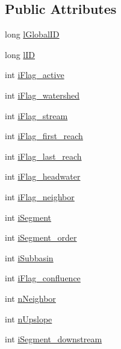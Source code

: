 \subsection*{Public Attributes}
\begin{DoxyCompactItemize}
\item 
long \hyperlink{classhexwatershed_1_1hexagon_accf17b2b8de32d01b9bd0a06ba492a4e}{l\-Global\-I\-D}
\item 
long \hyperlink{classhexwatershed_1_1hexagon_a9f4085d0184401658d991affe014ed0e}{l\-I\-D}
\item 
int \hyperlink{classhexwatershed_1_1hexagon_acbc3b3f0c16e635ce7d8c4c83456325b}{i\-Flag\-\_\-active}
\item 
int \hyperlink{classhexwatershed_1_1hexagon_a28e0a8923873cbd8e196c2b902fa4730}{i\-Flag\-\_\-watershed}
\item 
int \hyperlink{classhexwatershed_1_1hexagon_ad651b1f48c8e7369d3199a6a53c87061}{i\-Flag\-\_\-stream}
\item 
int \hyperlink{classhexwatershed_1_1hexagon_ac1c5a756f508d9880d1b5bbd92517cf4}{i\-Flag\-\_\-first\-\_\-reach}
\item 
int \hyperlink{classhexwatershed_1_1hexagon_a8358691197123bb90b2059ad85179e7a}{i\-Flag\-\_\-last\-\_\-reach}
\item 
int \hyperlink{classhexwatershed_1_1hexagon_a1a939fd274a91144584d445054f3ca0e}{i\-Flag\-\_\-headwater}
\item 
int \hyperlink{classhexwatershed_1_1hexagon_aa8e83f769286538ff90abbfc60f74897}{i\-Flag\-\_\-neighbor}
\item 
int \hyperlink{classhexwatershed_1_1hexagon_a6f47f3700e523504c25007a48c08eb4c}{i\-Segment}
\item 
int \hyperlink{classhexwatershed_1_1hexagon_afdc4b05dedeb6f2d51efcd47d8032ae5}{i\-Segment\-\_\-order}
\item 
int \hyperlink{classhexwatershed_1_1hexagon_a00eb23786a869e9ff01856d84e13deb7}{i\-Subbasin}
\item 
int \hyperlink{classhexwatershed_1_1hexagon_ac5b97dd7fc9f67c7980fe4fd99502e7f}{i\-Flag\-\_\-confluence}
\item 
int \hyperlink{classhexwatershed_1_1hexagon_ad970e85f9eb32cdd0c5c5a4fc9040c9d}{n\-Neighbor}
\item 
int \hyperlink{classhexwatershed_1_1hexagon_ad1bc8f0cbd9eceb413dff91d0ca759c0}{n\-Upslope}
\item 
int \hyperlink{classhexwatershed_1_1hexagon_a2e4f854acfb128f935e2d1c8190c2977}{i\-Segment\-\_\-downstream}

\end{DoxyCompactItemize}
